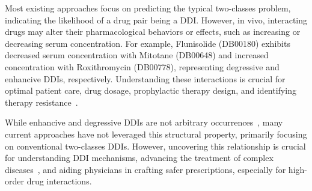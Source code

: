 \documentclass[unnumsec,webpdf,contemporary,large]{oup-authoring-template}%
\theoremstyle{thmstyleone}%
\theoremstyle{thmstyletwo}%
\theoremstyle{thmstylethree}%
\begin{document}
Most existing approaches focus on predicting the typical two-classes problem, indicating the likelihood of a drug pair being a DDI. However, in vivo, interacting drugs may alter their pharmacological behaviors or effects, such as increasing or decreasing serum concentration. For example, Flunisolide (DB00180) exhibits decreased serum concentration with Mitotane (DB00648) and increased concentration with Roxithromycin (DB00778), representing degressive and enhancive DDIs, respectively. Understanding these interactions is crucial for optimal patient care, drug dosage, prophylactic therapy design, and identifying therapy resistance~\cite{jan1981}.

While enhancive and degressive DDIs are not arbitrary occurrences~\cite{Shi2018, Yu2018}, many current approaches have not leveraged this structural property, primarily focusing on conventional two-classes DDIs. However, uncovering this relationship is crucial for understanding DDI mechanisms, advancing the treatment of complex diseases~\cite{Cokol2017}, and aiding physicians in crafting safer prescriptions, especially for high-order drug interactions.
\end{document}
